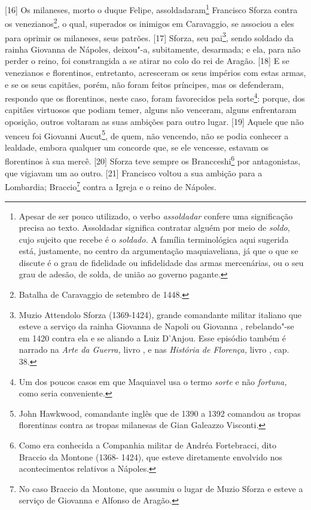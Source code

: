 {[}16{]} Os milaneses, morto o duque Felipe, assoldadaram\footnote{Apesar
  de ser pouco utilizado, o verbo \emph{assoldadar} confere uma
  significação precisa ao texto. Assoldadar significa contratar alguém
  por meio de \emph{soldo}, cujo sujeito que recebe é o \emph{soldado.}
  A família terminológica aqui sugerida está, justamente, no centro da
  argumentação maquiaveliana, já que o que se discute é o grau de
  fidelidade ou infidelidade das armas mercenárias, ou o seu grau de
  adesão, de solda, de união ao governo pagante.} Francisco Sforza
contra os venezianos\footnote{Batalha de Caravaggio de setembro de 1448.},
o qual, superados os inimigos em Caravaggio, se associou a eles para
oprimir os milaneses, seus patrões. {[}17{]} Sforza, seu pai\footnote{Muzio
  Attendolo Sforza (1369-1424), grande comandante militar italiano que
  esteve a serviço da rainha Giovanna de Napoli ou Giovanna ,
  rebelando"-se em 1420 contra ela e se aliando a Luiz  D'Anjou. Esse
  episódio também é narrado na \emph{Arte da Guerra,} livro , e nas
  \emph{História de Florença,} livro , cap. 38.}, sendo soldado da
rainha Giovanna de Nápoles, deixou"-a, subitamente, desarmada; e ela,
para não perder o reino, foi constrangida a se atirar no colo do rei de
Aragão. {[}18{]} E se venezianos e florentinos, entretanto, acresceram
os seus impérios com estas armas, e se os seus capitães, porém, não
foram feitos príncipes, mas os defenderam, respondo que os florentinos,
neste caso, foram favorecidos pela sorte\footnote{Um dos poucos casos em
  que Maquiavel usa o termo \emph{sorte} e não \emph{fortuna,} como
  seria conveniente.}: porque, dos capitães virtuosos que podiam temer,
alguns não venceram, alguns enfrentaram oposição, outros voltaram as
suas ambições para outro lugar. {[}19{]} Aquele que não venceu foi
Giovanni Aucut\footnote{John Hawkwood, comandante inglês que de 1390 a
  1392 comandou as tropas florentinas contra as tropas milanesas de Gian
  Galeazzo Visconti.}, de quem, não vencendo, não se podia conhecer a
lealdade, embora qualquer um concorde que, se ele vencesse, estavam os
florentinos à sua mercê. {[}20{]} Sforza teve sempre os
Brancceshi\footnote{Como era conhecida a Companhia militar de Andréa
  Fortebracci, dito Braccio da Montone (1368- 1424), que esteve
  diretamente envolvido nos acontecimentos relativos a Nápoles.} por
antagonistas, que vigiavam um ao outro. {[}21{]} Francisco voltou a sua
ambição para a Lombardia; Braccio\footnote{No caso Braccio da Montone,
  que assumiu o lugar de Muzio Sforza e esteve a serviço de Giovanna 
  e Alfonso de Aragão.} contra a Igreja e o reino de Nápoles.


